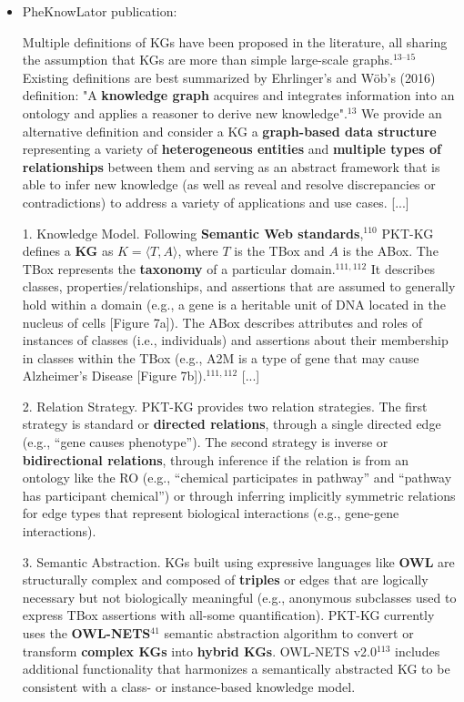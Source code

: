 \documentclass{article}
\begin{document}
\begin{itemize}

\item PheKnowLator publication:
\begin{displayquote}
Multiple definitions of KGs have been proposed in the literature, all sharing the assumption that KGs are more than simple large-scale graphs.$^{13–15}$ Existing definitions are best summarized by Ehrlinger's and Wöb's (2016) definition: "A \textbf{knowledge graph} acquires and integrates information into an ontology and applies a reasoner to derive new knowledge".$^{13}$ We provide an alternative definition and consider a KG a \textbf{graph-based data structure} representing a variety of \textbf{heterogeneous entities} and \textbf{multiple types of relationships} between them and serving as an abstract framework that is able to infer new knowledge (as well as reveal and resolve discrepancies or contradictions) to address a variety of applications and use cases.
[...]

1. Knowledge Model. Following \textbf{Semantic Web standards},$^{110}$ PKT-KG defines a \textbf{KG} as $ K = \langle T, A \rangle $, where $ T $ is the TBox and $ A $ is the ABox. The TBox represents the \textbf{taxonomy} of a particular domain.$ ^{111,112}$ It describes classes, properties/relationships, and assertions that are assumed to generally hold within a domain (e.g., a gene is a heritable unit of DNA located in the nucleus of cells [Figure 7a]). The ABox describes attributes and roles of instances of classes (i.e., individuals) and assertions about their membership in classes within the TBox (e.g., A2M is a type of gene that may cause Alzheimer’s Disease [Figure 7b]).$^{111,112}$
[...]

2. Relation Strategy. PKT-KG provides two relation strategies. The first strategy is standard or \textbf{directed relations}, through a single directed edge (e.g., “gene causes phenotype”). The second strategy is inverse or \textbf{bidirectional relations}, through inference if the relation is from an ontology like the RO (e.g., “chemical participates in pathway” and “pathway has participant chemical”) or through inferring implicitly symmetric relations for edge types that represent biological interactions (e.g., gene-gene interactions).

3. Semantic Abstraction. KGs built using expressive languages like \textbf{OWL} are structurally complex and composed of \textbf{triples} or edges that are logically necessary but not biologically meaningful (e.g., anonymous subclasses used to express TBox assertions with all-some quantification). PKT-KG currently uses the \textbf{OWL-NETS}$^{41}$ semantic abstraction algorithm to convert or transform \textbf{complex KGs} into \textbf{hybrid KGs}. OWL-NETS v2.0$^{113}$ includes additional functionality that harmonizes a semantically abstracted KG to be consistent with a class- or instance-based knowledge model.
\end{displayquote}

\end{itemize}
\end{document}
